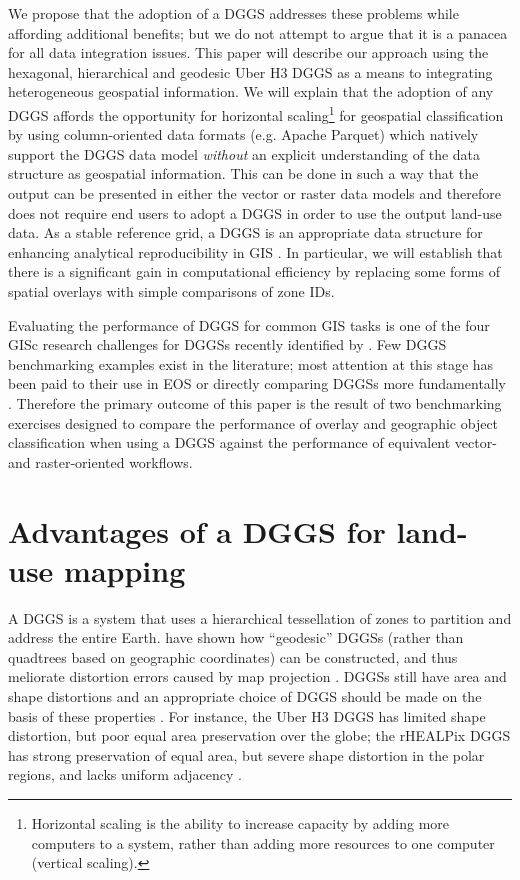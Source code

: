 \documentclass[]{interact}
\theoremstyle{plain}%
\theoremstyle{definition}
\theoremstyle{remark}
\begin{document}
We propose that the adoption of a \acf{DGGS} addresses these problems while affording additional benefits; but we do not attempt to argue that it is a panacea for all data integration issues. This paper will describe our approach using the hexagonal, hierarchical and geodesic Uber H3 \ac{DGGS} \citep{brodsky2018h3} as a means to integrating heterogeneous geospatial information. We will explain that the adoption of any \ac{DGGS} affords the opportunity for horizontal scaling\footnote{Horizontal scaling is the ability to increase capacity by adding more computers to a system, rather than adding more resources to one computer (vertical scaling).} for geospatial classification by using column-oriented data formats (e.g. Apache Parquet) which natively support the \ac{DGGS} data model \textit{without} an explicit understanding of the data structure as geospatial information. This can be done in such a way that the output can be presented in either the vector or raster data models and therefore does not require end users to adopt a \ac{DGGS} in order to use the output land-use data. As a stable reference grid, a \ac{DGGS} is an appropriate data structure for enhancing analytical reproducibility in \ac{GIS} \citep{purss2019datacubes,bondaruk2020assessing,etherington2022}. In particular, we will establish that there is a significant gain in computational efficiency by replacing some forms of spatial overlays with simple comparisons of zone IDs.

Evaluating the performance of \ac{DGGS} for common \ac{GIS} tasks is one of the four \ac{GISc} research challenges for \acp{DGGS} recently identified by \citet{hojati2022giscience}. Few \ac{DGGS} benchmarking examples exist in the literature; most attention at this stage has been paid to their use in \ac{EOS} or directly comparing \acp{DGGS} more fundamentally \citep{thompson2022ease,wu2022review}. Therefore the primary outcome of this paper is the result of two benchmarking exercises designed to compare the performance of overlay and geographic object classification when using a \ac{DGGS} against the performance of equivalent vector- and raster-oriented workflows.

\section{Advantages of a \ac{DGGS} for land-use mapping} %

A \ac{DGGS} is a system that uses a hierarchical tessellation of zones to partition and address the entire Earth. \citet{sahr2003geodesic} have shown how ``geodesic'' \acp{DGGS} (rather than quadtrees based on geographic coordinates) can be constructed, and thus meliorate distortion errors caused by map projection \citep{goodchild2018reimagining}. \Acp{DGGS} still have area and shape distortions and an appropriate choice of \ac{DGGS} should be made on the basis of these properties \citep{kmoch2022area}. For instance, the Uber H3 \ac{DGGS} has limited shape distortion, but poor equal area preservation over the globe; the rHEALPix \ac{DGGS} has strong preservation of equal area, but severe shape distortion in the polar regions, and lacks uniform adjacency \citep{kmoch2022area,gibb2016rhealpix,bowater2019exploring}.
\end{document}
